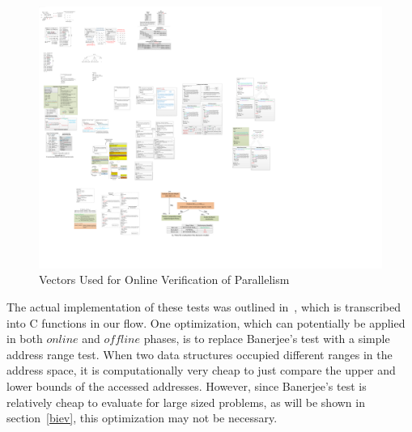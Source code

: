 \begin{figure}[htp]
\begin{center}
\includegraphics[width=1.0\linewidth]{chap6fig/onlineTesting2.pdf}
\caption{Vectors Used for Online Verification of Parallelism
\label{fig:testingOnline}}
\end{center}
\end{figure}
The actual implementation of these tests was outlined in~\cite{Kennedy:2001:OCM:502981}, which is transcribed into C functions in our flow. One optimization, which
can potentially be applied in both $online$ and $offline$ phases, is to replace Banerjee's test with a simple address range test. When two data structures occupied different ranges in the address space, it is
computationally very cheap to just compare the upper and lower bounds of the accessed addresses. 
However, since Banerjee's test is relatively cheap to evaluate for large sized problems, as will be shown in section~\ref{biev}, this optimization may not be necessary.

